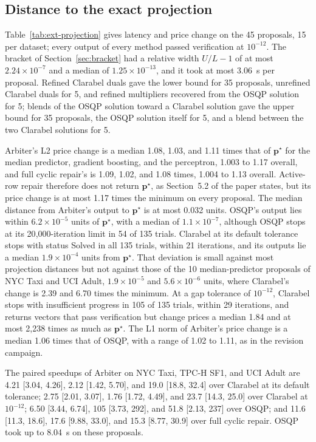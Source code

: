 \documentclass[10pt]{article}
\newcommand{\pvec}{\mathbf{p}}
\begin{document}


\subsection{Distance to the exact projection}
\label{sec:ext-projection}
Table~\ref{tab:ext-projection} gives latency and price change on the 45 proposals, 15 per dataset; every output of every method passed verification at $10^{-12}$. The bracket of Section~\ref{sec:bracket} had a relative width $U/L - 1$ of at most $2.24 \times 10^{-7}$ and a median of $1.25 \times 10^{-13}$, and it took at most 3.06~s per proposal. Refined Clarabel duals gave the lower bound for 35 proposals, unrefined Clarabel duals for 5, and refined multipliers recovered from the OSQP solution for 5; blends of the OSQP solution toward a Clarabel solution gave the upper bound for 35 proposals, the OSQP solution itself for 5, and a blend between the two Clarabel solutions for 5.

Arbiter's L2 price change is a median 1.08, 1.03, and 1.11 times that of $\pvec^{\star}$ for the median predictor, gradient boosting, and the perceptron, 1.003 to 1.17 overall, and full cyclic repair's is 1.09, 1.02, and 1.08 times, 1.004 to 1.13 overall. Active-row repair therefore does not return $\pvec^{\star}$, as Section~5.2 of the paper states, but its price change is at most 1.17 times the minimum on every proposal. The median distance from Arbiter's output to $\pvec^{\star}$ is at most 0.032 units. OSQP's output lies within $6.2 \times 10^{-5}$ units of $\pvec^{\star}$, with a median of $1.1 \times 10^{-7}$, although OSQP stops at its 20{,}000-iteration limit in 54 of 135 trials. Clarabel at its default tolerance stops with status Solved in all 135 trials, within 21 iterations, and its outputs lie a median $1.9 \times 10^{-4}$ units from $\pvec^{\star}$. That deviation is small against most projection distances but not against those of the 10 median-predictor proposals of NYC Taxi and UCI Adult, $1.9 \times 10^{-5}$ and $5.6 \times 10^{-6}$ units, where Clarabel's change is 2.39 and 6.70 times the minimum. At a gap tolerance of $10^{-12}$, Clarabel stops with insufficient progress in 105 of 135 trials, within 29 iterations, and returns vectors that pass verification but change prices a median 1.84 and at most 2{,}238 times as much as $\pvec^{\star}$. The L1 norm of Arbiter's price change is a median 1.06 times that of OSQP, with a range of 1.02 to 1.11, as in the revision campaign.

The paired speedups of Arbiter on NYC Taxi, TPC-H SF1, and UCI Adult are 4.21 [3.04, 4.26], 2.12 [1.42, 5.70], and 19.0 [18.8, 32.4] over Clarabel at its default tolerance; 2.75 [2.01, 3.07], 1.76 [1.72, 4.49], and 23.7 [14.3, 25.0] over Clarabel at $10^{-12}$; 6.50 [3.44, 6.74], 105 [3.73, 292], and 51.8 [2.13, 237] over OSQP; and 11.6 [11.3, 18.6], 17.6 [9.88, 33.0], and 15.3 [8.77, 30.9] over full cyclic repair. OSQP took up to 8.04~s on these proposals.
\end{document}
